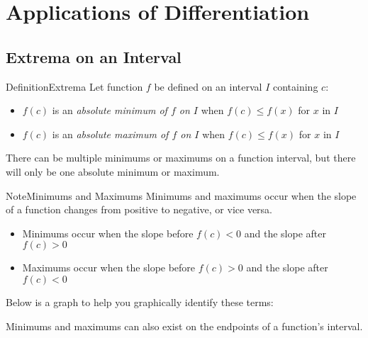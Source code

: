 \documentclass{MathNotes}
\newenvironment{definition}[1]{\begin{RedBox}{Definition}{#1}}{\end{RedBox}}
\newenvironment{note}[1]{\begin{YellowBox}{Note}{#1}}{\end{YellowBox}}
\begin{document}
\newpage
\section{Applications of Differentiation}\label{applications-of-differentiation}
\subsection{Extrema on an Interval}\label{sec:extrema-on-interval}
\begin{definition}{Extrema}\label{def:extrema}
	Let function $f$ be defined on an interval $I$ containing $c$:
	\begin{itemize}
		\item $f(c)$ is an \textit{absolute minimum of $f$ on $I$} when $f(c)\leq f(x)$
		      for $x$ in $I$
		\item $f(c)$ is an \textit{absolute maximum of $f$ on $I$} when $f(c)\leq f(x)$
		      for $x$ in $I$
	\end{itemize}

	There can be multiple minimums or maximums on a function interval, but
	there will only be one absolute minimum or maximum.
\end{definition}

\begin{note}{Minimums and Maximums}\label{note:minimums-and-maximums}
	Minimums and maximums occur when the slope of a function changes
	from positive to negative, or vice versa.
	\begin{itemize}
		\item Minimums occur when the slope before $f(c)<0$ and the slope after
		      $f(c)>0$
		\item Maximums occur when the slope before $f(c)>0$ and the slope after
		      $f(c)<0$
	\end{itemize}
\end{note}

Below is a graph to help you graphically identify these terms:
\begin{center}
	
\end{center}

Minimums and maximums can also exist on the endpoints of a function's
interval.
\end{document}
